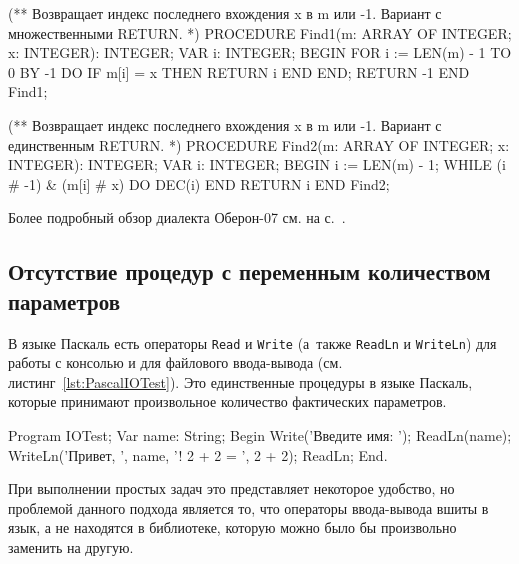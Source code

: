 \documentclass[utf8]{lgu}
\newcommand{\code}[1]{{\normalsize\texttt{#1}}}
\begin{document}
\begin{listing}[H]
\caption{Линейный поиск в массиве: неструктурный и структурный варианты}
\vspace{-17pt}
\label{lst:ArraySearch}
\begin{modula2}
(** Возвращает индекс последнего вхождения x в m
    или -1. Вариант с множественными RETURN. *)
PROCEDURE Find1(m: ARRAY OF INTEGER;
               x: INTEGER): INTEGER;
VAR i: INTEGER;
BEGIN
  FOR i := LEN(m) - 1 TO 0 BY -1 DO
    IF m[i] = x THEN
      RETURN i
    END
  END;
  RETURN -1
END Find1;

(** Возвращает индекс последнего вхождения x в m
    или -1. Вариант с единственным RETURN. *)
PROCEDURE Find2(m: ARRAY OF INTEGER;
               x: INTEGER): INTEGER;
VAR i: INTEGER;
BEGIN
  i := LEN(m) - 1;
  WHILE (i # -1) & (m[i] # x) DO DEC(i) END
RETURN i END Find2;
\end{modula2}
\end{listing}

\firstparskip Более подробный обзор диалекта Оберон-07 см. на с.~\pageref{sec:Oberon07}.

\subsection{Отсутствие процедур с переменным количеством параметров}

\firstparskip В языке Паскаль есть операторы \code{Read} и \code{Write} (а~также \code{ReadLn} и \code{WriteLn}) для работы с консолью и для файлового ввода-вывода (см. листинг~\ref{lst:PascalIOTest}). Это единственные процедуры в языке Паскаль, которые принимают произвольное количество фактических параметров.

\begin{listing}[H]
\caption{Произвольное количество параметров операторов ввода-вывода языка Паскаль}
\vspace{-17pt}
\label{lst:PascalIOTest}
\begin{pascal}
Program IOTest;
Var name: String;
Begin
  Write('Введите имя: ');
  ReadLn(name);
  WriteLn('Привет, ', name, '! 2 + 2 = ', 2 + 2);
  ReadLn;
End.
\end{pascal}
\end{listing}

При выполнении простых задач это представляет некоторое удобство, но проблемой данного подхода является то, что операторы ввода-вывода вшиты в язык, а не находятся в библиотеке, которую можно было бы произвольно заменить на другую.
\end{document}
